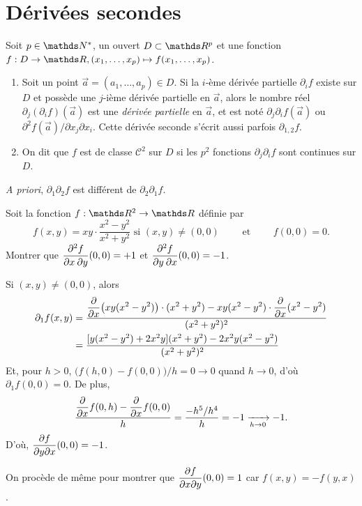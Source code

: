 \section{Dérivées secondes}

\begin{defn}
	Soit $p \in \N^*$, un ouvert $D \subset \R^p$ et une fonction $f : D \to \R, (x_1, \ldots, x_p) \mapsto f(x_1, \ldots, x_p)$.
	\begin{enumerate}
		\item Soit un point $\vec{a} = (a_1, \ldots, a_p) \in D$. Si la $i$-ème dérivée partielle $\partial_i f$ existe sur $D$ et possède une $j$-ième dérivée partielle en $\vec{a}$, alors le nombre réel $\partial_j (\partial_i f)(\vec{a})$ est une \textit{dérivée partielle} en $\vec{a}$, et est noté $\partial_j \partial_i f(\vec{a})$ ou $\partial^2 f(\vec{a}) / \partial x_j \partial x_i$.\footnotemark
			Cette dérivée seconde s'écrit aussi parfois $\partial_{1,2} f$.
		\item On dit que $f$ est de classe $\mathcal{C}^2$ sur $D$ si les $p^2$ fonctions $\partial_j \partial_i f$ sont continues sur $D$.
	\end{enumerate}
\end{defn}

\textit{A priori}, $\partial_1 \partial_2 f$ est différent de $\partial_2 \partial_1 f$.

\begin{exo}
	\begin{slshape}
		Soit la fonction $f : \R^2 \to \R$ définie par \[
			f(x,y) = xy \cdot \frac{x^2-y^2}{x^2 + y^2} \text{ si } (x,y) \neq (0,0) \quad\quad \text{ et } \quad\quad f(0,0) = 0
		.\]
		Montrer que $\displaystyle \frac{\partial^2 f}{\partial x\: \partial y}(0,0) = +1$ et $\displaystyle \frac{\partial^2 f}{\partial y\: \partial x}(0,0) = -1$.
	\end{slshape}

	Si $(x,y) \neq (0,0)$, alors
	\begin{align*}
		\partial_1 f(x,y) &= \frac{\displaystyle\frac{\partial }{\partial x} \big(xy(x^2 - y^2)\big)\cdot (x^2 + y^2) - xy(x^2 - y^2) \cdot \frac{\partial }{\partial x}(x^2 - y^2)}{(x^2 + y^2)^2}\\
		&= \frac{[y(x^2 - y^2) + 2x^2y](x^2 + y^2) - 2x^2y (x^2 - y^2)}{(x^2+y^2)^2} \\
	\end{align*}
	Et, pour $h > 0$, $\big(f(h, 0) - f(0,0)\big)/h = 0 \to 0$ quand $h \to 0$, d'où $\partial_1 f(0,0) = 0$.
	De plus, \[
		\frac{\displaystyle \frac{\partial }{\partial x}f(0,h) - \frac{\partial }{\partial x}f(0,0)}{h} = \frac{-h^5 / h^4}{h} = -1 \xrightarrow[h\to 0]{} -1
	.\]
	D'où, $\displaystyle \frac{\partial f}{\partial y\partial x}(0,0) = -1$.

	On procède de même pour montrer que $\displaystyle \frac{\partial f}{\partial x\partial y}(0,0) = 1$ car $f(x,y) = -f(y,x)$.
\end{exo}

